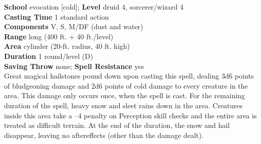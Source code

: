 \textbf{School} evocation [cold]; \textbf{Level} druid 4, sorcerer/wizard 4\\
\textbf{Casting Time} 1 standard action\\
\textbf{Components} V, S, M/DF (dust and water)\\
\textbf{Range} long (400 ft. + 40 ft./level)\\
\textbf{Area} cylinder (20-ft. radius, 40 ft. high)\\
\textbf{Duration} 1 round/level (D)\\
\textbf{Saving Throw} none; \textbf{Spell Resistance} yes\\
Great magical hailstones pound down upon casting this spell, dealing 3d6 points of bludgeoning damage and 2d6 points of cold damage to every creature in the area. This damage only occurs once, when the spell is cast. For the remaining duration of the spell, heavy snow and sleet rains down in the area. Creatures inside this area take a --4 penalty on Perception skill checks and the entire area is treated as difficult terrain. At the end of the duration, the snow and hail disappear, leaving no aftereffects (other than the damage dealt).\\

